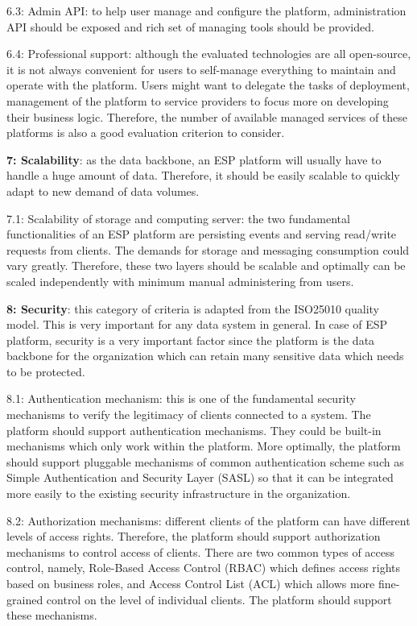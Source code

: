 6.3: Admin API: to help user manage and configure the platform, administration API should be exposed and rich set of managing tools should be provided. 

6.4: Professional support: although the evaluated technologies are all open-source, it is not always convenient for users to self-manage everything to maintain and operate with the platform. Users might want to delegate the tasks of deployment, management of the platform to service providers to focus more on developing their business logic. Therefore, the number of available managed services of these platforms is also a good evaluation criterion to consider.


\textbf{7: Scalability}: as the data backbone, an ESP platform will usually have to handle a huge amount of data. Therefore, it should be easily scalable to quickly adapt to new demand of data volumes.

7.1: Scalability of storage and computing server: the two fundamental functionalities of an ESP platform are persisting events and serving read/write requests from clients. The demands for storage and messaging consumption could vary greatly. Therefore, these two layers should be scalable and optimally can be scaled independently with minimum manual administering from users.

\textbf{8: Security}: this category of criteria is adapted from the ISO25010 quality model. This is very important for any data system in general. In case of ESP platform, security is a very important factor since the platform is the data backbone for the organization which can retain many sensitive data which needs to be protected.

8.1: Authentication mechanism: this is one of the fundamental security mechanisms to verify the legitimacy of clients connected to a system. The platform should support authentication mechanisms. They could be built-in mechanisms which only work within the platform. More optimally, the platform should support pluggable mechanisms of common authentication scheme such as Simple Authentication and Security Layer (SASL) so that it can be integrated more easily to the existing security infrastructure in the organization.

8.2: Authorization mechanisms: different clients of the platform can have different levels of access rights. Therefore, the platform should support authorization mechanisms to control access of clients. There are two common types of access control, namely, Role-Based Access Control (RBAC) which defines access rights based on business roles, and Access Control List (ACL) which allows more fine-grained control on the level of individual clients. The platform should support these mechanisms.

